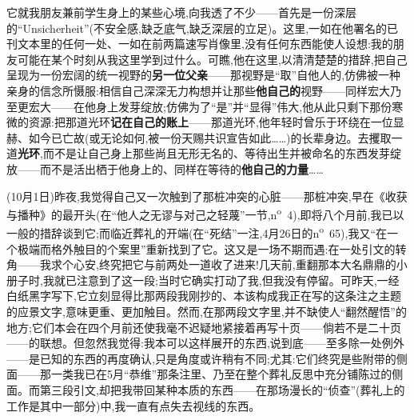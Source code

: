 它就我朋友兼前学生身上的某些心境,向我透了不少——首先是一份深层的“Unsicherheit”(不安全感,缺乏底气,缺乏深层的立足)。这里,一如在他署名的已刊文本里的任何一处、一如在前两篇速写肖像里,没有任何东西能使人设想:我的朋友可能在某个时刻从我这里学到过什么。可瞧,他在这里,以清清楚楚的措辞,把自己呈现为一份宏阔的统一视野的\textbf{另一位父亲}——那视野是“取”自他人的,仿佛被一种亲身的信念所慑服:相信自己深深无力构想并让那些\textbf{他自己的}视野——同样宏大乃至更宏大——在他身上发芽绽放;仿佛为了“是”并“显得”伟大,他从此只剩下那份寒微的资源:把那道光环\textbf{记在自己的账上}——那道光环,他年轻时曾乐于环绕在一位显赫、如今已亡故(或无论如何,被一份天赐共识宣告如此……)的长辈身边。去攫取一道\textbf{光环},而不是让自己身上那些尚且无形无名的、等待出生并被命名的东西发芽绽放——而不是活出栖于他身上的、同样在等待的\textbf{他自己的力量}……

(10月1日)昨夜,我觉得自己又一次触到了那桩冲突的心脏——那桩冲突,早在《收获与播种》的最开头(在“他人之无谬与对己之轻蔑”一节,n\textsuperscript{o}~4),即将八个月前,我已以一般的措辞谈到它;而临近葬礼的开端(在“死结”一注,4月26日的n\textsuperscript{o}~65),我又“在一个极端而格外触目的个案里”重新找到了它。这又是一场不期而遇:在一处引文的转角——我求个心安,终究把它与前两处一道收了进来!几天前,重翻那本大名鼎鼎的小册子时,我就已注意到了这一段;当时它确实打动了我,但我没有停留。可昨天,一经白纸黑字写下,它立刻显得比那两段我刚抄的、本该构成我正在写的这条注之主题的应景文字,意味更重、更加触目。然而,在那两段文字里,并不缺使人“翻然醒悟”的地方;它们本会在四个月前还使我毫不迟疑地\dmark{}紧接着再写十页——倘若不是二十页——的联想。但忽然我觉得:我本可以这样展开的东西,说到底——至多除一处例外——是已知的东西的再度确认,只是角度或许稍有不同;尤其:它们终究是些附带的侧面——那一类我已在5月“恭维”那条注里、乃至在整个葬礼反思中充分铺陈过的侧面。而第三段引文,却把我带回某种本质的东西——在那场漫长的“侦查”(葬礼上的工作是其中一部分)中,我一直有点失去视线的东西。

